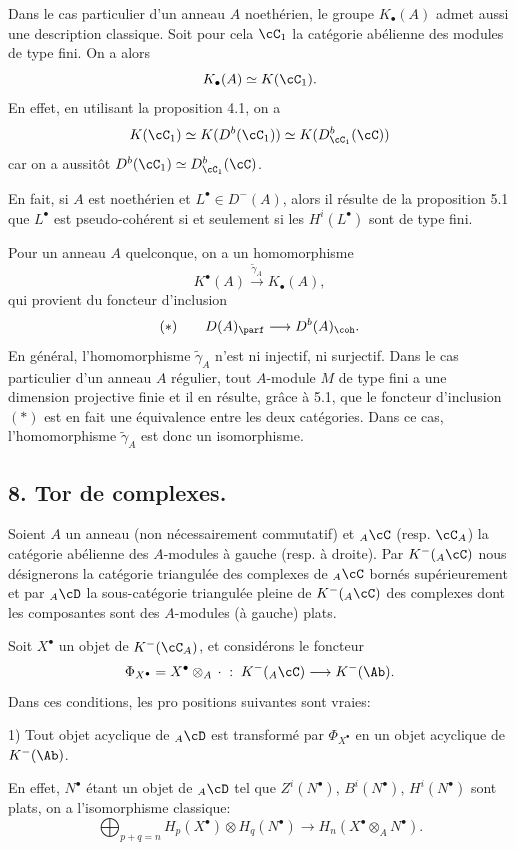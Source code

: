 Dans le cas particulier d'un anneau $A$ noethérien, le groupe $K_\bullet(A)$ admet aussi une description classique. Soit pour cela $\cC_1$ la catégorie abélienne des modules de type fini. On a alors
\[
K_\bullet(A)\simeq K(\cC_1).
\]
En effet, en utilisant la proposition 4.1, on a
\[
K(\cC_1)\simeq K(D^b(\cC_1))\simeq K(D^b_{\cC_1}(\cC))
\]
car on a
aussitôt $D^b(\cC_1)\simeq D^b_{\cC_1}(\cC)$.

En fait, si $A$ est noethérien et $L^\bullet\in D^-(A)$, alors il résulte de la proposition 5.1 que $L^\bullet$ est pseudo-cohérent si et seulement si les $H^i(L^\bullet)$ sont de type fini.

Pour un anneau $A$ quelconque, on a un homomorphisme
\[
K^{\bullet}(A)\xrightarrow{\widetilde\gamma_A}K_\bullet(A),
\]
qui provient du foncteur d'inclusion
\[
(*)\qquad D(A)_{\parf}\longrightarrow D^b(A)_{\coh}.
\]
En général, l'homomorphisme $\widetilde\gamma_A$ n'est ni injectif, ni surjectif. Dans le cas particulier d'un anneau $A$ régulier, tout $A$-module $M$ de type fini a une dimension projective finie et il en résulte, grâce à 5.1, que le foncteur d'inclusion $(*)$ est en fait une équivalence entre les deux catégories. Dans ce cas, l'homomorphisme $\widetilde\gamma_A$ est donc un isomorphisme.

\subsection*{8. Tor de complexes.}

Soient $A$ un anneau (non nécessairement commutatif) et ${}_A\cC$ (resp. $\cC_A$) la catégorie abélienne des $A$-modules à gauche (resp. à droite). Par $K^-({}_A\cC)$ nous désignerons la catégorie triangulée des complexes de ${}_A\cC$ bornés supérieurement et par ${}_A\cD$ la sous-catégorie triangulée pleine de $K^-({}_A\cC)$ des complexes dont les composantes sont des $A$-modules (à gauche) plats.

Soit $X^\bullet$ un objet de $K^-(\cC_A)$, et considérons le foncteur
\[
\Phi_{X^\bullet}=X^\bullet\otimes_A\,\cdot\;:\;K^-({}_A\cC)\longrightarrow K^-(\Ab).
\]
Dans ces conditions, les
pro%
positions suivantes sont vraies:

1) Tout objet acyclique de ${}_A\cD$ est transformé par $\Phi_{X^\bullet}$ en un objet acyclique de $K^-(\Ab)$.

En effet, $N^\bullet$ étant un objet de ${}_A\cD$ tel que $Z^i(N^\bullet)$, $B^i(N^\bullet)$, $H^i(N^\bullet)$ sont plats, on a l'isomorphisme classique:
\[
\bigoplus_{p+q=n}H_p(X^\bullet)\otimes H_q(N^\bullet)
\longrightarrow H_n(X^\bullet\otimes_A N^\bullet).
\]

